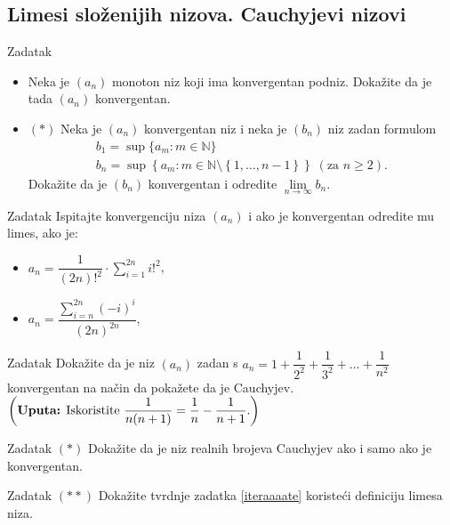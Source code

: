 \subsection*{Limesi složenijih nizova. Cauchyjevi nizovi}
\begin{exercise}{Zadatak} \textbf{}
\begin{itemize}
\item[a)] Neka je \((a_n)\) monoton niz koji ima konvergentan podniz. Dokažite da je tada \((a_n)\) konvergentan.
\item[b)] \((*)\) Neka je \((a_n)\) konvergentan niz i neka je \((b_n)\) niz zadan formulom
\begin{gather*}
b_1=\sup\{a_m : m\in \mathbb{N}\}\\
b_n=\sup\left\{a_m : m\in \mathbb{N}\setminus\left\{1, \dots, n-1\right\}\right\}\;(\text{za }n\geq 2).
\end{gather*}
\noindent Dokažite da je \((b_n)\) konvergentan i odredite \(\lim\limits_{n\to \infty}{b_n}\).
\end{itemize}
\end{exercise}
\begin{exercise}{Zadatak} Ispitajte konvergenciju niza \((a_n)\) i ako je konvergentan odredite mu limes, ako je:
\begin{itemize}
\item[a)] \(a_n=\dfrac{1}{(2n)!^2}\cdot\sum\limits_{i=1}^{2n}{i!^2}\),
\item[b)] \(a_n=\dfrac{\sum\limits_{i=n}^{2n}{(-i)^i}}{(2n)^{2n}}\),
\end{itemize}
\end{exercise}
\begin{exercise}{Zadatak}
Dokažite da je niz $(a_n)$ zadan s $a_n=1+\dfrac{1}{2^2}+\dfrac{1}{3^2}+\dots+\dfrac{1}{n^2}$ konvergentan na način da pokažete da je Cauchyjev. $\left(\text{\textbf{Uputa:} Iskoristite } \dfrac{1}{n(n+1)}=\dfrac{1}{n}-\dfrac{1}{n+1}.\right)$
\end{exercise}
\begin{exercise}{Zadatak} $(*)$
Dokažite da je niz realnih brojeva Cauchyjev ako i samo ako je konvergentan.
\end{exercise}
\begin{exercise}{Zadatak} \((**)\)
Dokažite tvrdnje zadatka \ref{iteraaaate} koristeći definiciju limesa niza.
\end{exercise}
